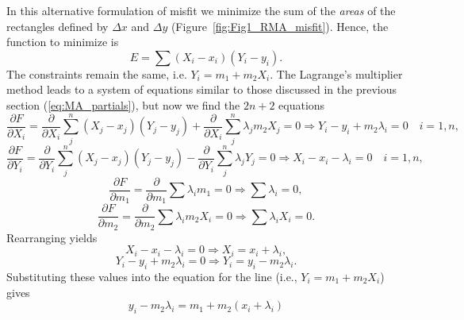 In this alternative formulation of misfit we minimize the sum of the \emph{areas} of the rectangles defined by $\Delta x$ and $\Delta y$ (Figure~\ref{fig:Fig1_RMA_misfit}).
Hence, the function to minimize is
\begin{equation}
E = \sum (X_i - x_i)(Y_i - y_i).
\label{eq:E_RMA_axis}
\end{equation}
The constraints remain the same, i.e. $Y_i = m_1 + m_2 X_i$.  The Lagrange's multiplier method leads to a 
system of equations similar to those discussed in the previous section (\ref{eq:MA_partials}), but now we find
the $2n + 2$ equations
\begin{equation}
\frac{\partial F}{\partial X_i} = \frac{\partial}{\partial X_i} \sum_j^n (X_j - x_j)(Y_j - y_j) + \frac{\partial}{\partial X_i} \sum_j^n \lambda_j m_2 X_j = 0 \Rightarrow Y_i - y_i + m_2 \lambda_i = 0  \quad i = 1,n,
\end{equation}	 	
\begin{equation}
\frac{\partial F}{\partial Y_i} = \frac{\partial}{\partial Y_i} \sum_j^n (X_j - x_j)(Y_j - y_j) - \frac{\partial}{\partial Y_i} \sum_j^n \lambda_j Y_j = 0 \Rightarrow X_i - x_i - \lambda_i = 0 \quad i = 1,n,
\end{equation}
\begin{equation}
\frac{\partial F}{\partial m_1} = \frac{\partial}{\partial m_1} \sum \lambda_i m_1 = 0 \Rightarrow \sum \lambda_i = 0,
\end{equation}
\begin{equation}
\frac{\partial F}{\partial m_2} = \frac{\partial}{\partial m_2} \sum \lambda_i m_2 X_i = 0 \Rightarrow \sum \lambda_i X_i = 0.
\label{eq:RMA_lxi}
\end{equation}
Rearranging yields     
\begin{equation}
X_i - x_i - \lambda_i = 0 \Rightarrow X_i = x_i + \lambda_i,
\end{equation}
\begin{equation}	           
Y_i - y_i + m_2 \lambda_i = 0 \Rightarrow Y_i = y_i - m_2\lambda_i.
\end{equation}
Substituting these values into the equation for the line (i.e., $Y_i = m_1 + m_2 X_i$) gives
\begin{equation}
y_i - m_2 \lambda_i = m_1 + m_2 (x_i + \lambda_i)
\end{equation}
